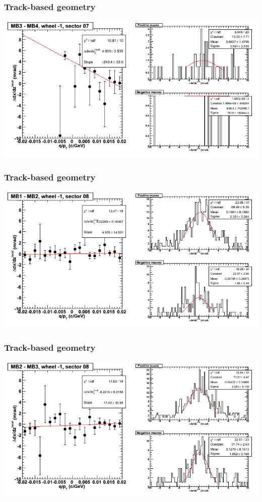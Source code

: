 \documentclass[compress]{beamer}
\begin{document}
\begin{frame}
\frametitle{Track-based geometry}
\includegraphics[width=\linewidth]{NOV4_segdiffs/dt13_slope_B_07_34.png}
\end{frame}

\begin{frame}
\frametitle{Track-based geometry}
\includegraphics[width=\linewidth]{NOV4_segdiffs/dt13_slope_B_08_12.png}
\end{frame}

\begin{frame}
\frametitle{Track-based geometry}
\includegraphics[width=\linewidth]{NOV4_segdiffs/dt13_slope_B_08_23.png}
\end{frame}
\end{document}
